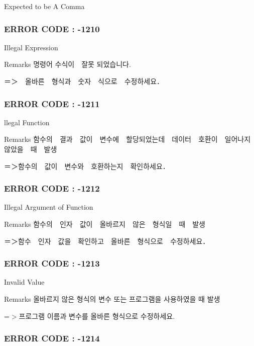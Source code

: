 Expected to be A Comma



 \subsubsection*{E\-R\-R\-O\-R C\-O\-D\-E \-: -\/1210 }

Illegal Expression \begin{DoxyRemark}{Remarks}
명령어 수식이　잘못 되었습니다. \par
 ＝＞　올바른　형식과　숫자　식으로　수정하세요．
\end{DoxyRemark}


 \subsubsection*{E\-R\-R\-O\-R C\-O\-D\-E \-: -\/1211 }

llegal Function \begin{DoxyRemark}{Remarks}
함수의　결과　값이　변수에　할당되었는데　데이터　호환이　일어나지　않았을　때　발생 \par
 ＝＞함수의　값이　변수와　호환하는지　확인하세요．
\end{DoxyRemark}


 \subsubsection*{E\-R\-R\-O\-R C\-O\-D\-E \-: -\/1212 }

Illegal Argument of Function \begin{DoxyRemark}{Remarks}
함수의　인자　값이　올바르지　않은　형식일　때　발생 \par
 ＝＞함수　인자　값을　확인하고　올바른　형식으로　수정하세요．
\end{DoxyRemark}


 \subsubsection*{E\-R\-R\-O\-R C\-O\-D\-E \-: -\/1213 }

Invalid Value \begin{DoxyRemark}{Remarks}
올바르지 않은 형식의 변수 또는 프로그램을 사용하였을 때 발생 \par
 =$>$프로그램 이름과 변수를 올바른 형식으로 수정하세요.
\end{DoxyRemark}


 \subsubsection*{E\-R\-R\-O\-R C\-O\-D\-E \-: -\/1214 }

